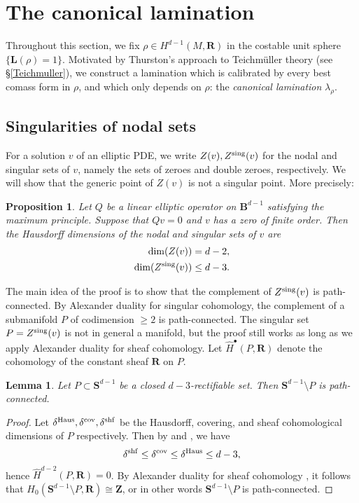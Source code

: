 \documentclass[reqno,11pt]{amsart}
\newcommand{\ZZ}{\mathbf{Z}}
\newcommand{\RR}{\mathbf{R}}
\newcommand{\Sph}{\mathbf S}
\newcommand{\Ball}{\mathbf{B}}
\newcommand{\Comass}{\mathbf L}
\newcommand{\dfn}[1]{\emph{#1}\index{#1}}
\newtheorem{lemma}[theorem]{Lemma}
\newtheorem{proposition}[theorem]{Proposition}
\theoremstyle{definition}
\numberwithin{equation}{section}
\begin{document}
\section{The canonical lamination}
Throughout this section, we fix $\rho \in H^{d - 1}(M, \RR)$ in the costable unit sphere $\{\Comass(\rho) = 1\}$.
Motivated by Thurston's approach to Teichm\"uller theory (see \S\ref{Teichmuller}), we construct a lamination which is calibrated by every best comass form in $\rho$, and which only depends on $\rho$: the \dfn{canonical lamination} $\lambda_\rho$.

\subsection{Singularities of nodal sets}\label{nodal appendix}
For a solution $v$ of an elliptic PDE, we write $Z(v), Z^{\rm sing}(v)$ for the nodal and singular sets of $v$, namely the sets of zeroes and double zeroes, respectively.
We will show that the generic point of $Z(v)$ is not a singular point. More precisely:

\begin{proposition}\label{nodal set is generically smooth}
Let $Q$ be a linear elliptic operator on $\Ball^{d - 1}$ satisfying the maximum principle.
Suppose that $Qv = 0$ and $v$ has a zero of finite order.
Then the Hausdorff dimensions of the nodal and singular sets of $v$ are
\begin{align}
	\dim(Z(v)) &= d - 2, \label{nodal dimension}\\
	\dim(Z^{\rm sing}(v)) &\leq d - 3. \label{singular nodal dimension}
\end{align}
\end{proposition}

The main idea of the proof is to show that the complement of $Z^{\rm sing}(v)$ is path-connected.
By Alexander duality for singular cohomology, the complement of a submanifold $P$ of codimension $\geq 2$ is path-connected.
The singular set $P = Z^{\rm sing}(v)$ is not in general a manifold, but the proof still works as long as we apply Alexander duality for sheaf cohomology.
Let $\hat H^\bullet(P, \RR)$ denote the cohomology of the constant sheaf $\RR$ on $P$.

\begin{lemma}\label{closed mfld complement}
Let $P \subset \Sph^{d - 1}$ be a closed $d - 3$-rectifiable set.
Then $\Sph^{d - 1} \setminus P$ is path-connected.
\end{lemma}
\begin{proof}
Let $\delta^{\rm Haus}, \delta^{\rm cov}, \delta^{\rm shf}$ be the Hausdorff, covering, and sheaf cohomological dimensions of $P$ respectively.
Then by \cite[{\S}II.5.12]{godement1973topologie} and \cite[Theorem 6.3.10]{edgar2008measure}, we have 
$$\delta^{\rm shf} \leq \delta^{\rm cov} \leq \delta^{\rm Haus} \leq d - 3,$$
hence $\hat H^{d - 2}(P, \RR) = 0$.
By Alexander duality for sheaf cohomology \cite[Theorem 6]{Kaplan47}, it follows that $H_0(\Sph^{d - 1} \setminus P, \RR) \cong \ZZ$, or in other words $\Sph^{d - 1} \setminus P$ is path-connected.
\end{proof}
\end{document}
